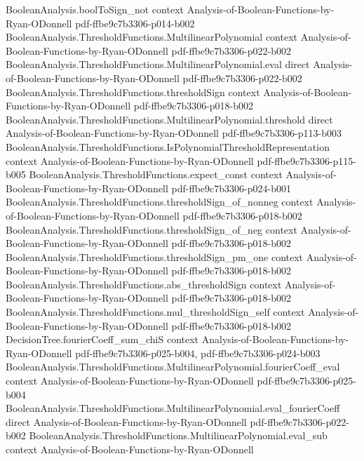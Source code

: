 \begin{theorem}
  {BooleanAnalysis.boolToSign_not}
  {context}
  {Analysis-of-Boolean-Functions-by-Ryan-ODonnell}
  {pdf-ffbe9c7b3306-p014-b002}
\proofstep
  {BooleanAnalysis.ThresholdFunctions.MultilinearPolynomial}
  {context}
  {Analysis-of-Boolean-Functions-by-Ryan-ODonnell}
  {pdf-ffbe9c7b3306-p022-b002}
\proofstep
  {BooleanAnalysis.ThresholdFunctions.MultilinearPolynomial.eval}
  {direct}
  {Analysis-of-Boolean-Functions-by-Ryan-ODonnell}
  {pdf-ffbe9c7b3306-p022-b002}
\proofstep
  {BooleanAnalysis.ThresholdFunctions.thresholdSign}
  {context}
  {Analysis-of-Boolean-Functions-by-Ryan-ODonnell}
  {pdf-ffbe9c7b3306-p018-b002}
\proofstep
  {BooleanAnalysis.ThresholdFunctions.MultilinearPolynomial.threshold}
  {direct}
  {Analysis-of-Boolean-Functions-by-Ryan-ODonnell}
  {pdf-ffbe9c7b3306-p113-b003}
\proofstep
  {BooleanAnalysis.ThresholdFunctions.IsPolynomialThresholdRepresentation}
  {context}
  {Analysis-of-Boolean-Functions-by-Ryan-ODonnell}
  {pdf-ffbe9c7b3306-p115-b005}
\proofstep
  {BooleanAnalysis.ThresholdFunctions.expect_const}
  {context}
  {Analysis-of-Boolean-Functions-by-Ryan-ODonnell}
  {pdf-ffbe9c7b3306-p024-b001}
\proofstep
  {BooleanAnalysis.ThresholdFunctions.thresholdSign_of_nonneg}
  {context}
  {Analysis-of-Boolean-Functions-by-Ryan-ODonnell}
  {pdf-ffbe9c7b3306-p018-b002}
\proofstep
  {BooleanAnalysis.ThresholdFunctions.thresholdSign_of_neg}
  {context}
  {Analysis-of-Boolean-Functions-by-Ryan-ODonnell}
  {pdf-ffbe9c7b3306-p018-b002}
\proofstep
  {BooleanAnalysis.ThresholdFunctions.thresholdSign_pm_one}
  {context}
  {Analysis-of-Boolean-Functions-by-Ryan-ODonnell}
  {pdf-ffbe9c7b3306-p018-b002}
\proofstep
  {BooleanAnalysis.ThresholdFunctions.abs_thresholdSign}
  {context}
  {Analysis-of-Boolean-Functions-by-Ryan-ODonnell}
  {pdf-ffbe9c7b3306-p018-b002}
\proofstep
  {BooleanAnalysis.ThresholdFunctions.mul_thresholdSign_self}
  {context}
  {Analysis-of-Boolean-Functions-by-Ryan-ODonnell}
  {pdf-ffbe9c7b3306-p018-b002}
\proofstep
  {DecisionTree.fourierCoeff_sum_chiS}
  {context}
  {Analysis-of-Boolean-Functions-by-Ryan-ODonnell}
  {pdf-ffbe9c7b3306-p025-b004,
    pdf-ffbe9c7b3306-p024-b003}
\proofstep
  {BooleanAnalysis.ThresholdFunctions.MultilinearPolynomial.fourierCoeff_eval}
  {context}
  {Analysis-of-Boolean-Functions-by-Ryan-ODonnell}
  {pdf-ffbe9c7b3306-p025-b004}
\proofstep
  {BooleanAnalysis.ThresholdFunctions.MultilinearPolynomial.eval_fourierCoeff}
  {direct}
  {Analysis-of-Boolean-Functions-by-Ryan-ODonnell}
  {pdf-ffbe9c7b3306-p022-b002}
\proofstep
  {BooleanAnalysis.ThresholdFunctions.MultilinearPolynomial.eval_sub}
  {context}
  {Analysis-of-Boolean-Functions-by-Ryan-ODonnell}

\end{theorem}
